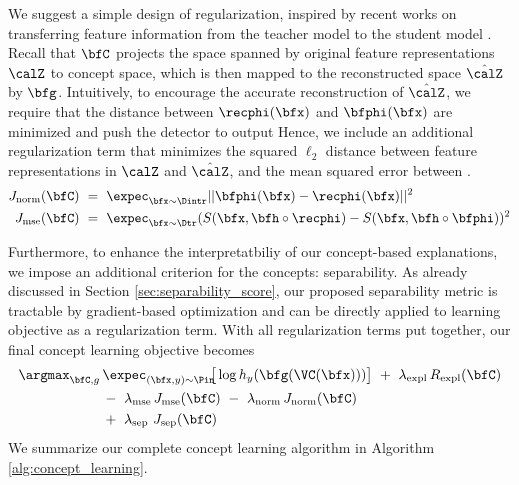 We suggest a simple design of regularization, inspired by recent works on transferring feature information from the teacher model to the student model \cite{hinton2015distilling,ba2014deep,zhou2018rocket}.
Recall that $\bfC$ projects the space spanned by original feature representations $\calZ$ to concept space, which is then mapped to the reconstructed space $\hat{\calZ}$ by $\bfg$.
Intuitively, to encourage the accurate reconstruction of $\hat{\calZ}$, we require that the distance between $\recphi(\bfx)$ and $\bfphi(\bfx)$ are minimized and push the detector to output
Hence, we include an additional regularization term that minimizes the squared $\ell_2$ distance between feature representations in $\calZ$ and $\hat{\calZ}$, and the mean squared error between . 
\begin{align}
\label{equ:regularizer_norm}
    J_{\textrm{norm}}(\bfC) ~&=~ \expec_{\bfx \sim \Dintr}||\bfphi(\bfx) - \recphi(\bfx)||^2 \\
    \label{equ:regularizer_mse}
    J_{\textrm{mse}}(\bfC) ~&=~ \expec_{\bfx \sim \Dtr} (S(\bfx, \bfh \circ \recphi) - S(\bfx, \bfh \circ \bfphi))^2
\end{align}

Furthermore, to enhance the interpretatbiliy of our concept-based explanations, we impose an additional criterion for the concepts: separability. As already discussed in Section \ref{sec:separability_score}, our proposed separability metric is tractable by gradient-based optimization and can be directly applied to learning objective as a regularization term.
With all regularization terms put together, our final concept learning objective becomes
\begin{align}
\label{equ: concept learning}
\argmax_{\bfC, g}\, &\expec_{(\bfx, y) \sim \Pin}\!\!\big[ \log h_y(\bfg(\VC(\bfx))) \big] ~+~ \lambda_{\textrm{expl}}\, R_{\textrm{expl}}(\bfC) \nonumber \\ 
    &-~ \lambda_{\textrm{mse}}\, J_{\textrm{mse}}(\bfC) ~-~ \lambda_{\textrm{norm}}\,J_{\textrm{norm}}(\bfC) \nonumber \\
    &+~ \lambda_{\textrm{sep}}~J_{\textrm{sep}}(\bfC)
\end{align}
We summarize our complete concept learning algorithm in Algorithm \ref{alg:concept_learning}.



